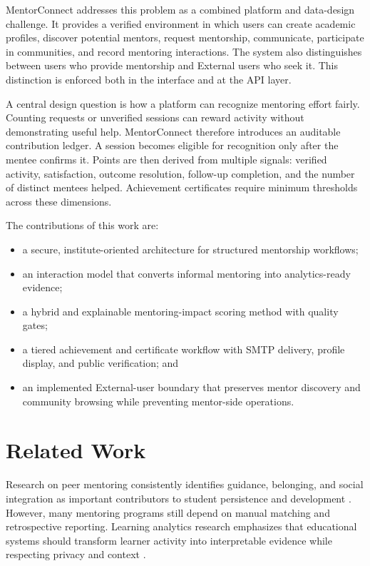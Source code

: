 \documentclass[conference]{IEEEtran}
\begin{document}
MentorConnect addresses this problem as a combined platform and data-design challenge. It provides a verified environment in which users can create academic profiles, discover potential mentors, request mentorship, communicate, participate in communities, and record mentoring interactions. The system also distinguishes between users who provide mentorship and External users who seek it. This distinction is enforced both in the interface and at the API layer.

A central design question is how a platform can recognize mentoring effort fairly. Counting requests or unverified sessions can reward activity without demonstrating useful help. MentorConnect therefore introduces an auditable contribution ledger. A session becomes eligible for recognition only after the mentee confirms it. Points are then derived from multiple signals: verified activity, satisfaction, outcome resolution, follow-up completion, and the number of distinct mentees helped. Achievement certificates require minimum thresholds across these dimensions.

The contributions of this work are:
\begin{itemize}
    \item a secure, institute-oriented architecture for structured mentorship workflows;
    \item an interaction model that converts informal mentoring into analytics-ready evidence;
    \item a hybrid and explainable mentoring-impact scoring method with quality gates;
    \item a tiered achievement and certificate workflow with SMTP delivery, profile display, and public verification; and
    \item an implemented External-user boundary that preserves mentor discovery and community browsing while preventing mentor-side operations.
\end{itemize}

\section{Related Work}
Research on peer mentoring consistently identifies guidance, belonging, and social integration as important contributors to student persistence and development \cite{tinto1993,gershenfeld2014}. However, many mentoring programs still depend on manual matching and retrospective reporting. Learning analytics research emphasizes that educational systems should transform learner activity into interpretable evidence while respecting privacy and context \cite{siemens2013,ferguson2012,knox2013,drachsler2015}.
\end{document}
